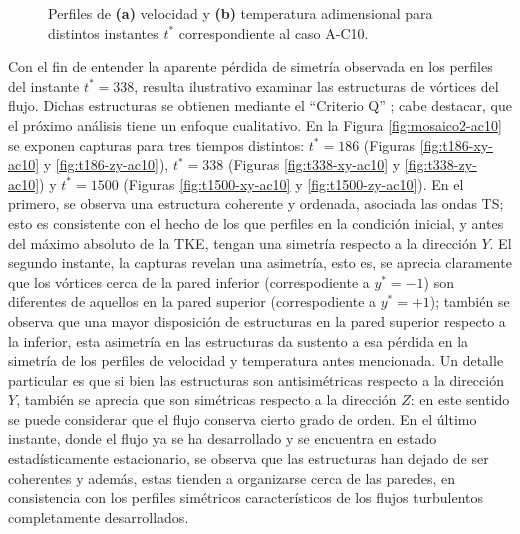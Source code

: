 \begin{figure}[H]
  \centering  
  
  \caption{Perfiles de \textbf{(a)} velocidad y \textbf{(b)} temperatura adimensional para distintos instantes $t^*$ correspondiente al caso A-C10.}
  \label{fig:mosaico-ac10}
\end{figure} 

Con el fin de entender la aparente pérdida de simetría observada en los perfiles del instante $t^* = 338$, resulta ilustrativo examinar las estructuras de vórtices del flujo. Dichas estructuras se obtienen mediante el ``Criterio Q'' \cite{hunt1988eddies}; cabe destacar, que el próximo análisis tiene un enfoque cualitativo. En la Figura \ref{fig:mosaico2-ac10} se exponen capturas para tres tiempos distintos: $t^* = 186$ (Figuras \ref{fig:t186-xy-ac10} y  \ref{fig:t186-zy-ac10}),  $t^* = 338$  (Figuras \ref{fig:t338-xy-ac10} y  \ref{fig:t338-zy-ac10}) y  $t^* = 1500$  (Figuras \ref{fig:t1500-xy-ac10} y  \ref{fig:t1500-zy-ac10}). En el primero, se observa una estructura coherente y ordenada, asociada las ondas TS; esto es consistente con el hecho de los que perfiles en la condición inicial, y antes del máximo absoluto de la TKE, tengan una simetría respecto a la dirección $Y$. El segundo instante, la capturas revelan una asimetría, esto es, se aprecia claramente que los vórtices cerca de la pared inferior (correspodiente a $y^*=-1$) son diferentes de aquellos en la pared superior (correspodiente a $y^*=+1$); también se observa que una mayor disposición de estructuras en la pared superior respecto a la inferior, esta asimetría en las estructuras da sustento a esa pérdida en la simetría de los perfiles de velocidad y temperatura antes mencionada. Un detalle particular es que si bien las estructuras son antisimétricas respecto a la dirección $Y$, también se aprecia que son simétricas respecto a la dirección $Z$: en este sentido se puede considerar que el flujo conserva cierto grado de orden. En el último instante, donde el flujo ya se ha desarrollado y se encuentra en estado estadísticamente estacionario, se observa que las estructuras han dejado de ser coherentes y además, estas tienden a organizarse cerca de las paredes, en consistencia con los perfiles simétricos característicos de los flujos turbulentos completamente desarrollados.

